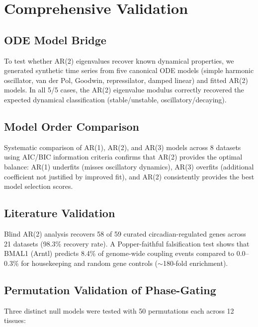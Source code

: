 \documentclass[11pt,letterpaper]{article}
\begin{document}

\section{Comprehensive Validation}
\label{sec:validation}

\subsection{ODE Model Bridge}

To test whether AR(2) eigenvalues recover known dynamical properties, we generated synthetic time series from five canonical ODE models (simple harmonic oscillator, van der Pol, Goodwin, repressilator, damped linear) and fitted AR(2) models. In all 5/5 cases, the AR(2) eigenvalue modulus correctly recovered the expected dynamical classification (stable/unstable, oscillatory/decaying).

\subsection{Model Order Comparison}

Systematic comparison of AR(1), AR(2), and AR(3) models across 8 datasets using AIC/BIC information criteria confirms that AR(2) provides the optimal balance: AR(1) underfits (misses oscillatory dynamics), AR(3) overfits (additional coefficient not justified by improved fit), and AR(2) consistently provides the best model selection scores.

\subsection{Literature Validation}

Blind AR(2) analysis recovers 58 of 59 curated circadian-regulated genes across 21 datasets (98.3\% recovery rate). A Popper-faithful falsification test shows that BMAL1 (Arntl) predicts 8.4\% of genome-wide coupling events compared to 0.0--0.3\% for housekeeping and random gene controls ($\sim$180-fold enrichment).

\subsection{Permutation Validation of Phase-Gating}

Three distinct null models were tested with 50 permutations each across 12 tissues:
\end{document}
